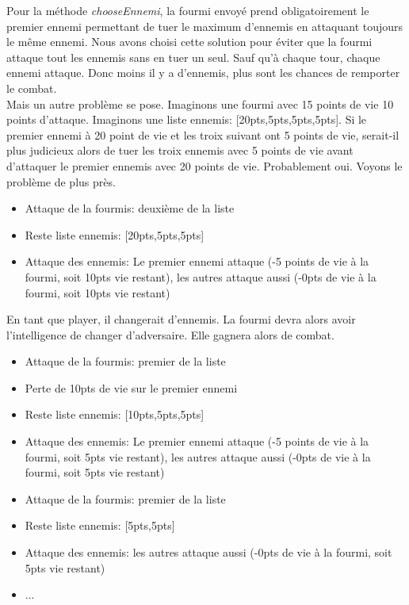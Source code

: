 		Pour la méthode \textit{chooseEnnemi}, la fourmi envoyé prend obligatoirement le premier ennemi permettant de tuer le maximum d'ennemis en attaquant toujours le même ennemi. Nous avons choisi cette solution pour éviter que la fourmi attaque tout les ennemis sans en tuer un seul. Sauf qu'à chaque tour, chaque ennemi attaque. Donc moins il y a d'ennemis, plus sont les chances de remporter le combat.\\
		Mais un autre problème se pose. Imaginons une fourmi avec 15 points de vie 10 points d'attaque. Imaginons une liste ennemis: [20pts,5pts,5pts,5pts]. Si le premier ennemi à 20 point de vie et les troix suivant ont 5 points de vie, serait-il plus judicieux alors de tuer les troix ennemis avec 5 points de vie avant d'attaquer le premier ennemis avec 20 points de vie. Probablement oui. Voyons le problème de plus près.
		\begin{itemize}
			\item Attaque de la fourmis: deuxième de la liste
			\item Reste liste ennemis: [20pts,5pts,5pts]
			\item Attaque des ennemis: Le premier ennemi attaque (-5 points de vie à la fourmi, soit 10pts vie restant), les autres attaque aussi (-0pts de vie à la fourmi, soit 10pts vie restant)
		\end{itemize}
		En tant que player, il changerait d'ennemis. La fourmi devra alors avoir l'intelligence de changer d'adversaire. Elle gagnera alors de combat.
		\begin{itemize}
			\item Attaque de la fourmis: premier de la liste
			\item Perte de 10pts de vie sur le premier ennemi
			\item Reste liste ennemis: [10pts,5pts,5pts]
			\item Attaque des ennemis: Le premier ennemi attaque (-5 points de vie à la fourmi, soit 5pts vie restant), les autres attaque aussi (-0pts de vie à la fourmi, soit 5pts vie restant)
			\item Attaque de la fourmis: premier de la liste
			\item Reste liste ennemis: [5pts,5pts]
			\item Attaque des ennemis: les autres attaque aussi (-0pts de vie à la fourmi, soit 5pts vie restant)
			\item ...
		\end{itemize}
